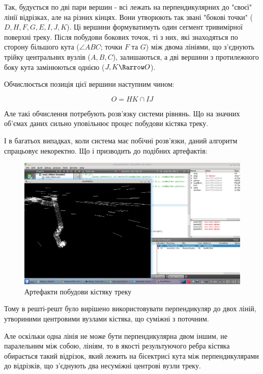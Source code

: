 \documentclass[simple,a4paper,14pt,ukrainian,utf8]{eskdtext}
\begin{document}
		Так, будується по дві пари вершин - всі лежать на перпендикулярних до "своєї" лінії відрізках, але на різних кінцях. Вони утворюють так звані "бокові точки" ($D, H, F, G, E, I, J, K$). Ці вершини формуватимуть один сегмент тривимірної поверхні треку. Після побудови бокових точок, ті з них, які знаходяться по сторону більшого кута ($\angle ABC$; точки $F$ та $G$) між двома лініями, що з’єднують трійку центральних вузлів ($A, B, C$), залишаються, а дві вершини з протилежного боку кута замінюються однією ($J, K \Rarrow O$).
		
		Обчислюється позиція цієї вершини наступним чином: 
		
		$$
			O = HK \cap IJ
		$$
		
		Але такі обчислення потребують розв’язку системи рівнянь. Що на значних об’ємах даних сильно уповільнює процес побудови кістяка треку.
		
		І в багатьох випадках, коли система має побічні розв’язки, даний алгоритм спрацьовує некоректно. Що і призводить до подібних артефактів:
		
		\vspace{2em}
		\begin{figure}
			\centering \includegraphics[scale=0.45]{images/road2d_1.png}
			\caption{Артефакти побудови кістяку треку}
		\end{figure}
		
		Тому в решті-решт було вирішено використовувати перпендикуляр до двох ліній, утвориними центровими вузлами кістяка, що суміжні з поточним.
		
		Але оскільки одна лінія не може бути перпендикулярна двом іншим, не паралельним між собою, лініям, то в якості результуючого ребра кістяка обирається такий відрізок, який лежить на бісектрисі кута між перпендикулярами до відрізків, що з’єднують два несуміжні центрові вузли треку.
		
\end{document}
